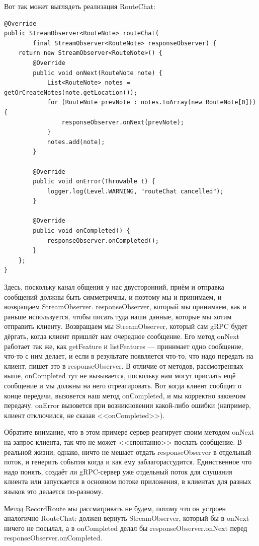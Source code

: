 \documentclass[a5paper]{article}
\begin{document}
Вот так может выглядеть реализация RouteChat:

\begin{verbatim}
@Override
public StreamObserver<RouteNote> routeChat(
        final StreamObserver<RouteNote> responseObserver) {
    return new StreamObserver<RouteNote>() {
        @Override
        public void onNext(RouteNote note) {
            List<RouteNote> notes = getOrCreateNotes(note.getLocation());
            for (RouteNote prevNote : notes.toArray(new RouteNote[0])) {
                responseObserver.onNext(prevNote);
            }
            notes.add(note);
        }

        @Override
        public void onError(Throwable t) {
            logger.log(Level.WARNING, "routeChat cancelled");
        }

        @Override
        public void onCompleted() {
            responseObserver.onCompleted();
        }
    };
}
\end{verbatim}

Здесь, поскольку канал общения у нас двусторонний, приём и отправка сообщений должны быть симметричны, и поэтому мы и принимаем, и возвращаем StreamObserver. responseObserver, который мы принимаем, как и раньше используется, чтобы писать туда наши данные, которые мы хотим отправить клиенту. Возвращаем мы StreamObserver, который сам gRPC будет дёргать, когда клиент пришлёт нам очередное сообщение. Его метод onNext работает так же, как getFeature и listFeatures --- принимает одно сообщение, что-то с ним делает, и если в результате появляется что-то, что надо передать на клиент, пишет это в responseObserver. В отличие от методов, рассмотренных выше, onCompleted тут не вызывается, поскольку нам могут прислать ещё сообщение и мы должны на него отреагировать. Вот когда клиент сообщит о конце передачи, вызовется наш метод onCompleted, и мы корректно закончим передачу. onError вызовется при возникновении какой-либо ошибки (например, клиент отключился, не сказав <<onCompleted>>).

Обратите внимание, что в этом примере сервер реагирует своим методом onNext на запрос клиента, так что не может <<спонтанно>> послать сообщение. В реальной жизни, однако, ничто не мешает отдать responseObserver в отдельный поток, и генерить события когда и как ему заблагорассудится. Единственное что надо понять, создаёт ли gRPC-сервер уже отдельный поток для слушания клиента или запускается в основном потоке приложения, в клиентах для разных языков это делается по-разному.

Метод RecordRoute мы рассматривать не будем, потому что он устроен аналогично RouteChat: должен вернуть StreamObserver, который бы в onNext ничего не посылал, а в onCompleted делал бы responseObserver.onNext перед responseObserver.onCompleted.
\end{document}
